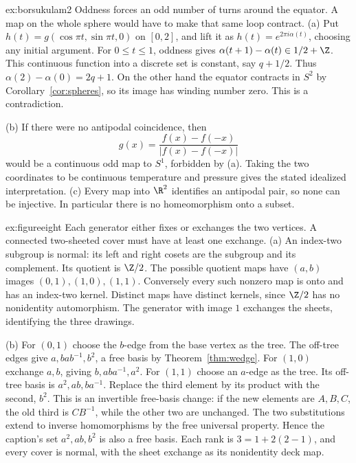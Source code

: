\begin{solution}{ex:borsukulam2}
\idea Oddness forces an odd number of turns around the equator. A map on the whole sphere would have to make that same loop contract.
\writeup (a) Put $h(t)=g(\cos\pi t,\sin\pi t,0)$ on $[0,2]$, and lift it as $h(t)=e^{2\pi i\alpha(t)}$, choosing any initial argument. For $0\le t\le1$, oddness gives
$\alpha(t+1)-\alpha(t)\in1/2+\Z$. This continuous function into a discrete set is constant, say $q+1/2$. Thus $\alpha(2)-\alpha(0)=2q+1$. On the other hand the equator contracts in $S^2$ by Corollary~\ref{cor:spheres}, so its image has winding number zero. This is a contradiction.

(b) If there were no antipodal coincidence, then
\[
g(x)=\frac{f(x)-f(-x)}{|f(x)-f(-x)|}
\]
would be a continuous odd map to $S^1$, forbidden by (a). Taking the two coordinates to be continuous temperature and pressure gives the stated idealized interpretation. (c) Every map into $\R^2$ identifies an antipodal pair, so none can be injective. In particular there is no homeomorphism onto a subset.
\end{solution}

\begin{solution}{ex:figureeight}
\idea Each generator either fixes or exchanges the two vertices. A connected two-sheeted cover must have at least one exchange.
\writeup (a) An index-two subgroup is normal: its left and right cosets are the subgroup and its complement. Its quotient is $\Z/2$. The possible quotient maps have $(a,b)$ images $(0,1),(1,0),(1,1)$. Conversely every such nonzero map is onto and has an index-two kernel. Distinct maps have distinct kernels, since $\Z/2$ has no nonidentity automorphism. The generator with image $1$ exchanges the sheets, identifying the three drawings.

(b) For $(0,1)$ choose the $b$-edge from the base vertex as the tree. The off-tree edges give $a,bab^{-1},b^2$, a free basis by Theorem~\ref{thm:wedge}. For $(1,0)$ exchange $a,b$, giving $b,aba^{-1},a^2$. For $(1,1)$ choose an $a$-edge as the tree. Its off-tree basis is $a^2,ab,ba^{-1}$. Replace the third element by its product with the second, $b^2$. This is an invertible free-basis change: if the new elements are $A,B,C$, the old third is $CB^{-1}$, while the other two are unchanged. The two substitutions extend to inverse homomorphisms by the free universal property. Hence the caption's set $a^2,ab,b^2$ is also a free basis. Each rank is $3=1+2(2-1)$, and every cover is normal, with the sheet exchange as its nonidentity deck map.
\end{solution}


